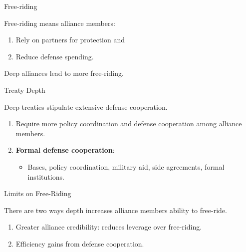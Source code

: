 \documentclass[12pt]{beamer}
\begin{document}

\begin{frame}{Free-riding}

Free-riding means alliance members:

\begin{enumerate} 
\pause
\item Rely on partners for protection and  
\pause
\item Reduce defense spending.
\end{enumerate}  

\end{frame}


\begin{frame}[standout]

Deep alliances lead to more free-riding.   

\end{frame}


\begin{frame}{Treaty Depth}

Deep treaties stipulate extensive defense cooperation. 

\begin{enumerate} 
\pause
\item Require more policy coordination and defense cooperation among alliance members. 
\item \textbf{Formal defense cooperation}:
\pause
\begin{itemize}
\item Bases, policy coordination, military aid, side agreements, formal institutions. 
\end{itemize}  
\end{enumerate}  

\end{frame}



\begin{frame}{Limits on Free-Riding}

There are two ways depth increases alliance members ability to free-ride. 

\begin{enumerate}
\pause
\item Greater alliance credibility: reduces leverage over free-riding.   
\pause
\item Efficiency gains from defense cooperation.  
\end{enumerate}

\end{frame}
\end{document}

